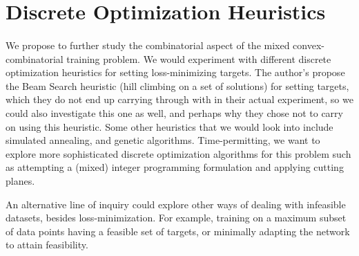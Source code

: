 \section{Discrete Optimization Heuristics}\label{heuristics}
\paragraph{}
We propose to further study the combinatorial aspect of the mixed convex-combinatorial training problem. We would experiment with different discrete optimization heuristics for setting loss-minimizing targets. The author's propose the Beam Search heuristic (hill climbing on a set of solutions) for setting targets, which they do not end up carrying through with in their actual experiment, so we could also investigate this one as well, and perhaps why they chose not to carry on using this heuristic. Some other heuristics that we would look into include simulated annealing, and genetic algorithms. Time-permitting, we want to explore more sophisticated discrete optimization algorithms for this problem such as attempting a (mixed) integer programming formulation and applying cutting planes.

An alternative line of inquiry could explore other ways of dealing with infeasible datasets, besides loss-minimization. For example, training on a maximum subset of data points having a feasible set of targets, or minimally adapting the network to attain feasibility.